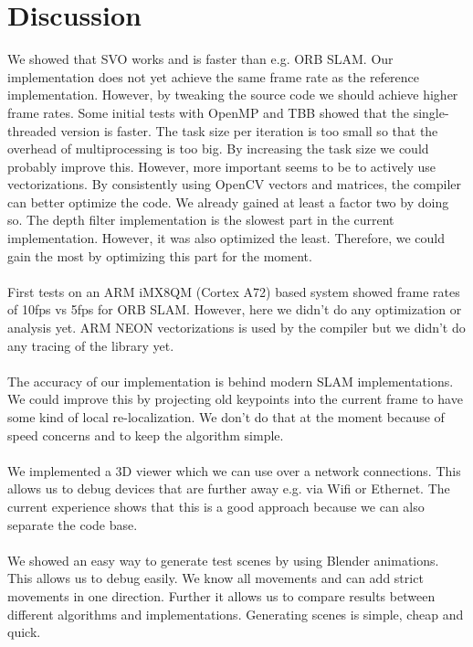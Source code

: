 \documentclass[11pt,a4paper,titlepage,oneside]{report}
\begin{document}
\chapter{Discussion}\label{ch:discussion}

We showed that SVO works and is faster than e.g. ORB SLAM. Our implementation does not yet achieve the same frame rate as the reference implementation. However, by tweaking the source code we should achieve higher frame rates. Some initial tests with OpenMP and TBB showed that the single-threaded version is faster. The task size per iteration is too small so that the overhead of multiprocessing is too big. By increasing the task size we could probably improve this. However, more important seems to be to actively use vectorizations. By consistently using OpenCV vectors and matrices, the compiler can better optimize the code. We already gained at least a factor two by doing so. The depth filter implementation is the slowest part in the current implementation. However, it was also optimized the least. Therefore, we could gain the most by optimizing this part for the moment.\\\\
First tests on an ARM iMX8QM (Cortex A72) based system showed frame rates of 10fps vs 5fps for ORB SLAM. However, here we didn't do any optimization or analysis yet. ARM NEON vectorizations is used by the compiler but we didn't do any tracing of the library yet.\\\\
The accuracy of our implementation is behind modern SLAM implementations. We could improve this by projecting old keypoints into the current frame to have some kind of local re-localization. We don't do that at the moment because of speed concerns and to keep the algorithm simple.\\\\
We implemented a 3D viewer which we can use over a network connections. This allows us to debug devices that are further away e.g. via Wifi or Ethernet. The current experience shows that this is a good approach because we can also separate the code base.\\\\
We showed an easy way to generate test scenes by using Blender animations. This allows us to debug easily. We know all movements and can add strict movements in one direction. Further it allows us to compare results between different algorithms and implementations. Generating scenes is simple, cheap and quick.\\\\
\end{document}
